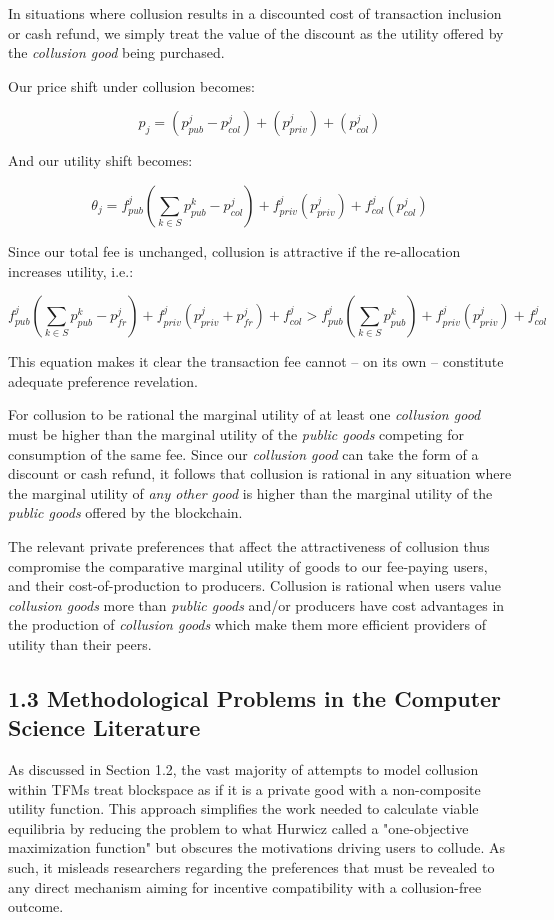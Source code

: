 \documentclass[oneside]{article}   	%
\begin{document}
In situations where collusion results in a discounted cost of transaction inclusion or cash refund, we simply treat the value of the discount as the utility offered by the \textit{collusion good} being purchased.

Our price shift under collusion becomes:

$$
p_j = \left( p_{pub}^j - p_{col}^j \right) + \left( p_{priv}^j \right) + \left( p_{col}^j \right)
$$

And our utility shift becomes:

$$
\theta_j = f_{pub}^j\left(\sum_{k \in S} p_{pub}^{k} - p_{col}^j \right) + f_{priv}^j\left( p_{priv}^j \right) + f_{col}^j\left(p_{col}^j \right)
$$

Since our total fee is unchanged, collusion is attractive if the re-allocation increases utility, i.e.:

\[
f_{pub}^j\left(\sum_{k \in S} p_{pub}^{k} - p_{fr}^j \right) + f_{priv}^j( p_{priv}^j + p_{fr}^j ) + f_{col}^j
>
f_{pub}^j\left(\sum_{k \in S} p_{pub}^{k}\right) + f_{priv}^j(p_{priv}^j) + f_{col}^j
\]

This equation makes it clear the transaction fee cannot -- on its own -- constitute adequate preference revelation.

For collusion to be rational the marginal utility of at least one \textit{collusion good} must be higher than the marginal utility of the \textit{public goods} competing for consumption of the same fee. Since our \textit{collusion good} can take the form of a discount or cash refund, it follows that collusion is rational in any situation where the marginal utility of \textit{any other good} is higher than the marginal utility of the \textit{public goods} offered by the blockchain.

The relevant private preferences that affect the attractiveness of collusion thus compromise the comparative marginal utility of goods to our fee-paying users, and their cost-of-production to producers. Collusion is rational when users value \textit{collusion goods} more than \textit{public goods} and/or producers have cost advantages in the production of \textit{collusion goods} which make them more efficient providers of utility than their peers.

\subsection*{1.3 Methodological Problems in the Computer Science Literature}

As discussed in Section 1.2, the vast majority of attempts to model collusion within TFMs treat blockspace as if it is a private good with a non-composite utility function. This approach simplifies the work needed to calculate viable equilibria by reducing the problem to what Hurwicz called a "one-objective maximization function" but obscures the motivations driving users to collude. As such, it misleads researchers regarding the preferences that must be revealed to any direct mechanism aiming for incentive compatibility with a collusion-free outcome. 
\end{document}
